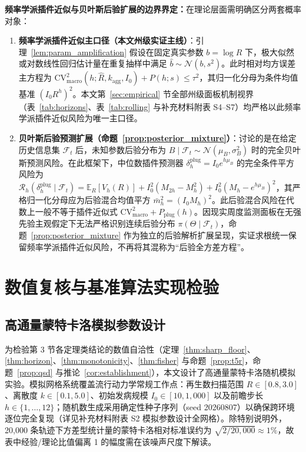 \documentclass[11pt,a4paper]{article}
\theoremstyle{plain}
\theoremstyle{definition}
\begin{document}
\noindent\textbf{频率学派插件近似与贝叶斯后验扩展的边界界定：}在理论层面需明确区分两套概率对象：
\begin{enumerate}
\item \textbf{频率学派插件近似主口径（本文州级实证主线）}：引理~\ref{lem:param_amplification} 假设在固定真实参数 $b = \log R$ 下，极大似然或对数线性回归估计量在重复抽样中满足 $\hat{b} \sim \mathcal{N}(b, s^2)$。此时相对均方误差主方程为 $\text{CV}^2_{\text{macro}}(h; \hat{R}, k_{\text{agg}}, I_0) + P(h; s) \le \tau^2$，其归一化分母为条件均值基准 $(I_0 R^h)^2$。本文第~\ref{sec:empirical} 节全部州级面板机制视界（表~\ref{tab:horizons}、表~\ref{tab:rolling} 与补充材料附表 S4--S7）均严格以此频率学派插件近似风险为唯一主口径。
\item \textbf{贝叶斯后验预测扩展（命题~\ref{prop:posterior_mixture}）}：讨论的是在给定历史信息集 $\mathcal{F}_t$ 后，未知参数后验分布为 $B \mid \mathcal{F}_t \sim \mathcal{N}(\mu_B, \sigma_B^2)$ 时的完全贝叶斯预测风险。在此框架下，中位数插件预测器 $\delta_h^{\text{plug}} = I_0 e^{h\mu_B}$ 的完全条件平方风险为 $\mathcal{R}_h(\delta_h^{\text{plug}} \mid \mathcal{F}_t) = \mathbb{E}_R[V_h(R)] + I_0^2(M_{2h} - M_h^2) + I_0^2(M_h - e^{h\mu_B})^2$，其严格归一化分母应为后验混合均值平方 $\bar{m}_h^2 = (I_0 M_h)^2$。此后验混合风险在代数上一般不等于插件近似式 $\text{CV}^2_{\text{macro}} + P_{\text{plug}}(h)$。因现实周度监测面板在无强先验主观假定下无法严格识别连续后验分布 $\pi(\Theta \mid \mathcal{F}_t)$，命题~\ref{prop:posterior_mixture} 作为独立的后验解析扩展呈现，实证求根统一保留频率学派插件近似风险，不再将其混称为“后验全方差方程”。
\end{enumerate}

\section{数值复核与基准算法实现检验}\label{sec:simulation}

\subsection{高通量蒙特卡洛模拟参数设计}

为检验第 3 节各定理类结论的数值自洽性（定理~\ref{thm:sharp_floor}、\ref{thm:horizon}、\ref{thm:monotonicity}、\ref{thm:fisher} 与命题~\ref{prop:t5r}，命题~\ref{prop:qsd} 与推论~\ref{cor:establishment}），本文设计了高通量蒙特卡洛随机模拟实验。模拟网格系统覆盖流行动力学常规工作点：再生数扫描范围 $R \in [0.8, 3.0]$、离散度 $k \in [0.1, 5.0]$、初始发病规模 $I_0 \in [10, 1{,}000]$ 以及前瞻步长 $h \in \{1, \dots, 12\}$；随机数生成采用确定性种子序列（seed 20260807）以确保跨环境逐位完全复现（详见补充材料附表 S2 模拟参数设计全网格）。除特别说明外，20,000 条轨迹下方差型统计量的蒙特卡洛相对标准误约为 $\sqrt{2/20{,}000} \approx 1\%$，故表中经验/理论比值偏离 1 的幅度需在该噪声尺度下解读。
\end{document}
